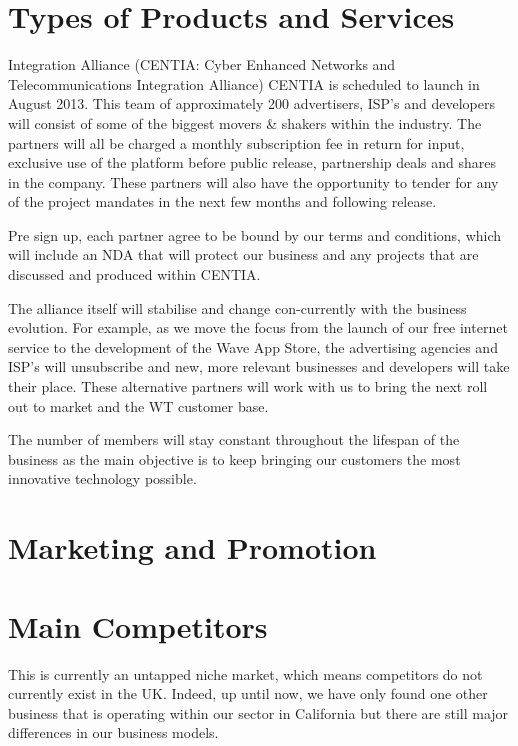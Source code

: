 \documentclass[letterpaper,10pt,openany,oneside,english]{sphinxmanual}
\begin{document}
\section{Types of Products and Services}
\label{\detokenize{market-analysis:types-of-products-and-services}}
Integration Alliance (CENTIA: Cyber Enhanced Networks and Telecommunications Integration
Alliance)
CENTIA is scheduled to launch in August 2013. This team of approximately 200 advertisers, ISP’s
and developers will consist of some of the biggest movers \& shakers within the industry.
The partners will all be charged a monthly subscription fee in return for input, exclusive use of
the platform before public release, partnership deals and shares in the company. These partners
will also have the opportunity to tender for any of the project mandates in the next few months
and following release.

Pre sign up, each partner agree to be bound by our terms and conditions, which will include an
NDA that will protect our business and any projects that are discussed and produced within
CENTIA.

The alliance itself will stabilise and change con-currently with the business evolution. For
example, as we move the focus from the launch of our free internet service to the development
of the Wave App Store, the advertising agencies and ISP’s will unsubscribe and new, more
relevant businesses and developers will take their place. These alternative partners will work
with us to bring the next roll out to market and the WT customer base.

The number of members will stay constant throughout the lifespan of the business as the main
objective is to keep bringing our customers the most innovative technology possible.


\section{Marketing and Promotion}
\label{\detokenize{market-analysis:marketing-and-promotion}}

\section{Main Competitors}
\label{\detokenize{market-analysis:main-competitors}}
This is currently an untapped niche market, which means competitors do not currently exist in
the UK. Indeed, up until now, we have only found one other business that is operating within
our sector in California but there are still major differences in our business models.
\end{document}
